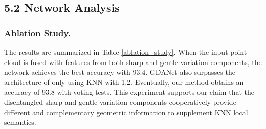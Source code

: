 \documentclass[letterpaper]{article} \usepackage{aaai21}  \usepackage{times}  \usepackage{helvet} \usepackage{courier}  \usepackage[hyphens]{url}  \usepackage{graphicx} \urlstyle{rm} \def\UrlFont{\rm}  \usepackage{natbib}  \usepackage{caption} \frenchspacing  \setlength{\pdfpagewidth}{8.5in}  \setlength{\pdfpageheight}{11in}  \usepackage{color}
\begin{document}
\begin{table}[t]
\begin{center}
	\caption{Classification results (\%) of using different point selection methods in our Geometry-Disentangle Module.}
	\label{ablation_study_2}
\end{center}
\end{table}

\subsection{5.2 Network Analysis}\label{5.2} 
\subsubsection{Ablation Study.}
The results are summarized in Table \ref{ablation_study}. When the input point cloud is fused with features from both sharp and gentle variation components, the network achieves the best accuracy with 93.4. GDANet also surpasses the architecture of only using KNN with 1.2. Eventually, our method obtains an accuracy of 93.8 with voting tests. This experiment supports our claim that the disentangled sharp and gentle variation components cooperatively provide different and complementary geometric information to supplement KNN local semantics.
\end{document}
